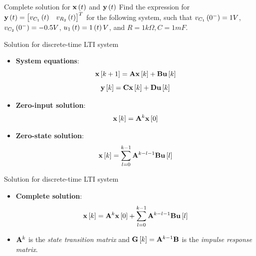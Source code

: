 \documentclass[aspectratio=169]{beamer}
\def\mf{\ensuremath\mathbf}
\def\lp{\ensuremath\left(}
\def\rp{\ensuremath\right)}
\def\ls{\ensuremath\left[}
\def\rs{\ensuremath\right]}
\def\bmx{\ensuremath\begin{bmatrix*}[r]}
\def\emx{\ensuremath\end{bmatrix*}}
\newcommand{\ct}[1]{\lp #1\rp}
\newcommand{\dt}[1]{\ls #1\rs}
\begin{document}
\begin{frame}[t]{Complete solution for $\mf{x}\ct{t}$ and $\mf{y}\ct{t}$}
Find the expression for $\mf{y}\ct{t} = \bmx v_{C_1}\ct{t} & v_{R_2}\ct{t}\emx^T$ for the following system, such that $v_{C_1}\ct{0^-} = 1V$, $v_{C_2}\ct{0^-} = -0.5V$, $u_1\ct{t} = 1\ct{t}V$, and $R=1k\Omega, C=1mF$.
\vspace{-0.3cm}
\begin{center}
\end{center}
\end{frame}


\begin{frame}[t]{Solution for discrete-time LTI system}
\begin{itemize}
    \item \textbf{System equations}:
    \[ \mf{x}\dt{k+1} = \mf{A}\mf{x}\dt{k} + \mf{B}\mf{u}\dt{k} \]
    \[ \mf{y}\dt{k} = \mf{C}\mf{x}\dt{k} + \mf{D}\mf{u}\dt{k} \]

    \item \textbf{Zero-input solution}:
    $$\mf{x}\dt{k} = \mf{A}^k\mf{x}\dt{0}$$

    \item \textbf{Zero-state solution}:
    $$ \mf{x}\dt{k} = \sum_{l=0}^{k-1}\mf{A}^{k-l-1}\mf{B}\mf{u}\dt{l}$$
\end{itemize}
\end{frame}


\begin{frame}[t]{Solution for discrete-time LTI system}
\begin{itemize}
    \item \textbf{Complete solution}:
    $$\mf{x}\dt{k} = \mf{A}^k\mf{x}\dt{0} + \sum_{l=0}^{k-1}\mf{A}^{k-l-1}\mf{B}\mf{u}\dt{l}$$

    \item $\mf{A}^k$ is the \textit{state transition matrix} and $\mf{G}\dt{k} = \mf{A}^{k - 1}\mf{B}$ is the \textit{impulse response matrix}.
\end{itemize}
\end{frame}
\end{document}
